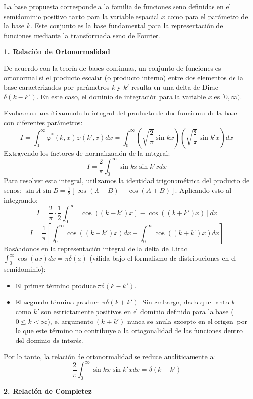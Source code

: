 \documentclass[a4paper]{article}
\begin{document}
La base propuesta corresponde a la familia de funciones seno definidas en el semidominio positivo tanto para la variable espacial $x$ como para el parámetro de la base $k$. Este conjunto es la base fundamental para la representación de funciones mediante la transformada seno de Fourier.

\textbf{1. Relación de Ortonormalidad}

De acuerdo con la teoría de bases continuas, un conjunto de funciones es ortonormal si el producto escalar (o producto interno) entre dos elementos de la base caracterizados por parámetros $k$ y $k'$ resulta en una delta de Dirac $\delta(k - k')$. En este caso, el dominio de integración para la variable $x$ es $[0, \infty)$.

Evaluamos analíticamente la integral del producto de dos funciones de la base con diferentes parámetros:
$$ I = \int_{0}^{\infty} \varphi^*(k, x) \varphi(k', x) dx = \int_{0}^{\infty} \left( \sqrt{\frac{2}{\pi}} \sin kx \right) \left( \sqrt{\frac{2}{\pi}} \sin k'x \right) dx $$
Extrayendo los factores de normalización de la integral:
$$ I = \frac{2}{\pi} \int_{0}^{\infty} \sin kx \sin k'x dx $$
Para resolver esta integral, utilizamos la identidad trigonométrica del producto de senos: $\sin A \sin B = \frac{1}{2} [\cos(A-B) - \cos(A+B)]$. Aplicando esto al integrando:
$$ I = \frac{2}{\pi} \cdot \frac{1}{2} \int_{0}^{\infty} \left[ \cos((k - k')x) - \cos((k + k')x) \right] dx $$
$$ I = \frac{1}{\pi} \left[ \int_{0}^{\infty} \cos((k - k')x) dx - \int_{0}^{\infty} \cos((k + k')x) dx \right] $$
Basándonos en la representación integral de la delta de Dirac $\int_{0}^{\infty} \cos(ax) dx = \pi \delta(a)$ (válida bajo el formalismo de distribuciones en el semidominio):
\begin{itemize}
    \item El primer término produce $\pi \delta(k - k')$.
    \item El segundo término produce $\pi \delta(k + k')$. Sin embargo, dado que tanto $k$ como $k'$ son estrictamente positivos en el dominio definido para la base ($0 \leq k < \infty$), el argumento $(k + k')$ nunca se anula excepto en el origen, por lo que este término no contribuye a la ortogonalidad de las funciones dentro del dominio de interés.
\end{itemize}

Por lo tanto, la relación de ortonormalidad se reduce analíticamente a:
$$ \frac{2}{\pi} \int_{0}^{\infty} \sin kx \sin k'x dx = \delta(k - k') $$

\textbf{2. Relación de Completez}
\end{document}
